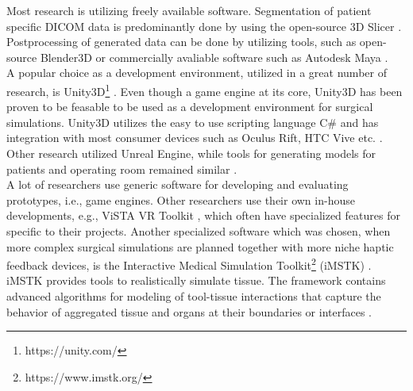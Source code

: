 Most research is utilizing freely available software.
Segmentation of patient specific DICOM data is predominantly done by using the open-source 3D Slicer \cite{Barber.2018,Barber.2020}.
Postprocessing of generated data can be done by utilizing tools, such as open-source Blender3D or commercially avaliable software such as Autodesk Maya \cite{Barber.2020,Parham.2019,Sampogna.2017}.
\\ A popular choice as a development environment, utilized in a great number of research, is Unity3D\footnote{https://unity.com/} \cite{Parham.2019,Pulijala.2017,Sampogna.2017}.
Even though a game engine at its core, Unity3D has been proven to be feasable to be used as a development environment for surgical simulations.
Unity3D utilizes the easy to use scripting language C\# and has integration with most consumer devices such as Oculus Rift, HTC Vive etc. \cite{wang2010new}.
\\
Other research utilized Unreal Engine, while tools for generating models for patients and operating room remained similar \cite{Barber.2020}.
\\
A lot of researchers use generic software for developing and evaluating prototypes, i.e., game engines. Other researchers use their own in-house developments, e.g., ViSTA VR Toolkit \cite{RN70}, which often 
have specialized features for specific to their projects.
Another specialized software which was chosen, when more complex surgical simulations are planned together with more niche haptic feedback devices, is 
the Interactive Medical Simulation Toolkit\footnote{https://www.imstk.org/} (iMSTK) \cite{VenkataS.Arikatla.2018}.
iMSTK provides tools to realistically simulate tissue. 
The framework contains advanced algorithms for modeling of tool-tissue interactions that capture the behavior of 
aggregated tissue and organs at their boundaries or interfaces \cite{VenkataS.Arikatla.2018}.